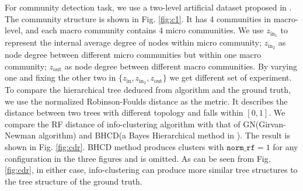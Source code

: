 \documentclass{article}
\begin{document}
For community detection task, we use a two-level artificial dataset proposed in \cite{RN22}. 
The community structure is shown in Fig. \ref{fig:c1}. It has 4 communities in macro-level, and each macro community contains 4 micro communities. We use $z_{\mathrm{in}_1}$ to represent the internal average degree of nodes within micro community; $z_{\mathrm{in}_2}$ as node degree between different micro communities but within one macro community; $z_{\mathrm{out}}$ as node degree between different macro communities. By varying one and fixing the other two in $\{z_{\mathrm{in}} , z_{\mathrm{in}_2}, z_{\mathrm{out}} \}$ we get different set of experiment. To compare the hierarchical tree deduced from algorithm and the ground truth, we use the normalized Robinson-Foulds distance as the metric. It describes the distance between two trees with different topology and falls within $[0,1]$. We compare the RF distance of info-clustering algorithm with that of GN(Girvan-Newman algorithm) and BHCD(a Bayes Hierarchical method in \cite{RN23}). The result is shown in Fig. \ref{fig:cdr}. BHCD method produces clusters with $\texttt{norm\_rf}=1$ for any configuration in the three figures and is omitted. As can be seen from Fig.\ref{fig:cdr}, in either case, info-clustering can produce more similar tree structures to the tree structure of the ground truth.
\end{document}
